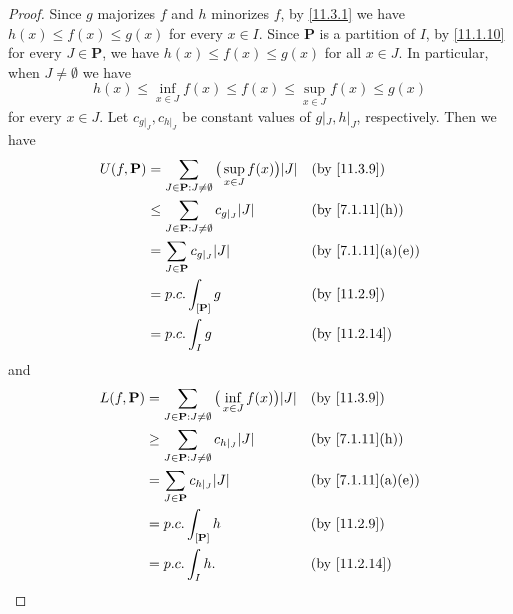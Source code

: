 \begin{proof}
  Since \(g\) majorizes \(f\) and \(h\) minorizes \(f\), by \cref{11.3.1} we have \(h(x) \leq f(x) \leq g(x)\) for every \(x \in I\).
  Since \(\mathbf{P}\) is a partition of \(I\), by \cref{11.1.10} for every \(J \in \mathbf{P}\), we have \(h(x) \leq f(x) \leq g(x)\) for all \(x \in J\).
  In particular, when \(J \neq \emptyset\) we have
  \[
    h(x) \leq \inf_{x \in J} f(x) \leq f(x) \leq \sup_{x \in J} f(x) \leq g(x)
  \]
  for every \(x \in J\).
  Let \(c_{g|_J}, c_{h|_J}\) be constant values of \(g|_J, h|_J\), respectively.
  Then we have
  \begin{align*}
    U(f, \mathbf{P}) & = \sum_{J \in \mathbf{P} : J \neq \emptyset} \big(\sup_{x \in J} f(x)\big) \abs{J} &  & \text{(by \cref{11.3.9})}       \\
                     & \leq \sum_{J \in \mathbf{P} : J \neq \emptyset} c_{g|_J} \abs{J}                   &  & \text{(by \cref{7.1.11}(h))}    \\
                     & = \sum_{J \in \mathbf{P}} c_{g|_J} \abs{J}                                         &  & \text{(by \cref{7.1.11}(a)(e))} \\
                     & = p.c. \int_{[\mathbf{P}]} g                                                       &  & \text{(by \cref{11.2.9})}       \\
                     & = p.c. \int_I g                                                                    &  & \text{(by \cref{11.2.14})}
  \end{align*}
  and
  \begin{align*}
    L(f, \mathbf{P}) & = \sum_{J \in \mathbf{P} : J \neq \emptyset} \big(\inf_{x \in J} f(x)\big) \abs{J} &  & \text{(by \cref{11.3.9})}       \\
                     & \geq \sum_{J \in \mathbf{P} : J \neq \emptyset} c_{h|_J} \abs{J}                   &  & \text{(by \cref{7.1.11}(h))}    \\
                     & = \sum_{J \in \mathbf{P}} c_{h|_J} \abs{J}                                         &  & \text{(by \cref{7.1.11}(a)(e))} \\
                     & = p.c. \int_{[\mathbf{P}]} h                                                       &  & \text{(by \cref{11.2.9})}       \\
                     & = p.c. \int_I h.                                                                   &  & \text{(by \cref{11.2.14})}
  \end{align*}
\end{proof}

